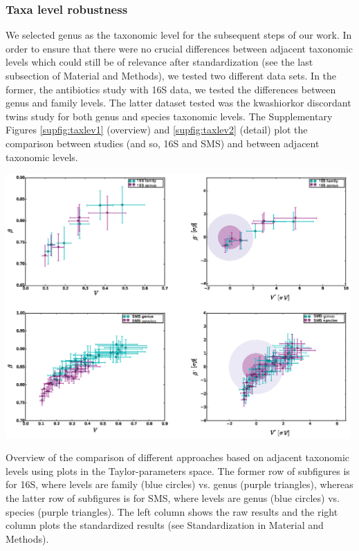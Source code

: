 \subsubsection*{Taxa level robustness}
We selected genus as the taxonomic level for the subsequent steps of our work. In order to ensure that there were no crucial differences between adjacent taxonomic levels which could still be of relevance after standardization (see the last subsection of Material and Methods), we tested two different data sets. In the former, the antibiotics study\cite{antibiotic} with 16S data, we tested the differences between genus and family levels. The latter dataset tested was the kwashiorkor discordant twins study\cite{kwashiorkor} for both genus and species taxonomic levels. The Supplementary Figures \ref{supfig:taxlev1} (overview) and \ref{supfig:taxlev2} (detail) plot the comparison between studies (and so, 16S and SMS) and between adjacent taxonomic levels.

\begin{supfig} 
  \includegraphics[width=0.99\textwidth]{figs/supfig_taxlev1.eps}
\caption{Overview of the comparison of different approaches based on adjacent taxonomic levels using plots in the Taylor-parameters space. The former row of subfigures is for 16S, where levels are family (blue circles) vs. genus (purple triangles), whereas the latter row of subfigures is for SMS, where levels are genus (blue circles) vs. species (purple triangles). The left column shows the raw results and the right column plots the standardized results (see Standardization in Material and Methods).}
\label{supfig:taxlev1}
\end{supfig}

